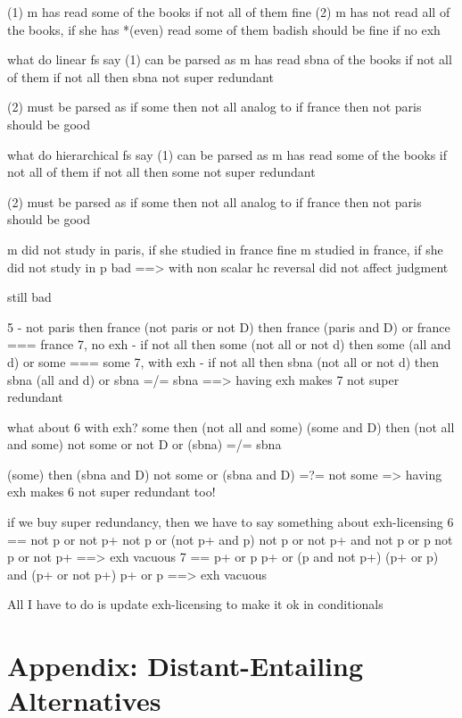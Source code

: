 (1) m has read some of the books if not all of them fine 
(2) m has not read all of the books, if she has *(even) read some of them badish should be fine if no exh

what do linear fs say
(1) can be parsed as
m has read sbna of the books if not all of them
if not all then sbna not super redundant

(2) must be parsed as 
if some then not all
analog to if france then not paris should be good


what do hierarchical fs say
(1) can be parsed as
m has read some of the books if not all of them
if not all then some not super redundant

(2) must be parsed as 
if some then not all
analog to if france then not paris should be good



m did not study in paris, if she studied in france fine
m studied in france, if she did not study in p bad
==> with non scalar hc reversal did not affect judgment


\begin{exe}
	 still bad
\end{exe}
5 - not paris then france
(not paris or not D) then france
(paris and D) or france === france
7, no exh - if not all then some
(not all or not d) then some
(all and d) or some === some 
7, with exh - if not all then sbna
(not all or not d) then sbna
(all and d) or sbna =/= sbna
==> having exh makes 7 not super redundant

what about 6 with exh?
some then (not all and some)
(some and D) then (not all and some)
not some or not D or (sbna)  =/= sbna 

(some) then (sbna and D)
not some or (sbna and D) =?= not some
=> having exh makes 6 not super redundant too!

if we buy super redundancy, then we have to say something about exh-licensing
6 == not p or not p+
not p or (not p+ and p)
not p or not p+ and not p or p
not p or not p+
==> exh vacuous
7 == p+ or p
p+ or (p and not p+)
(p+ or p) and (p+ or not p+)
p+ or p
==> exh vacuous

All I have to do is update exh-licensing to make it ok in conditionals


\section{Appendix: Distant-Entailing Alternatives}\label{sec7:ded}

